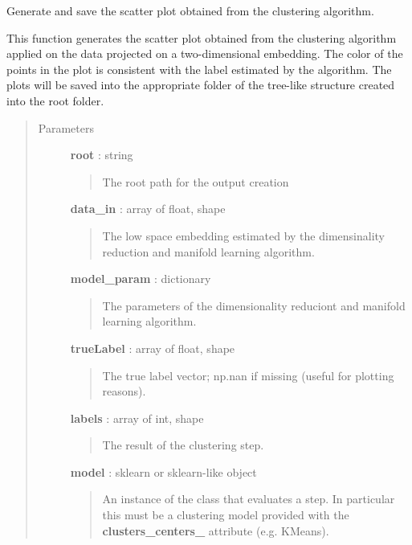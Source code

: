 \documentclass[letterpaper,10pt,english]{sphinxmanual}
\begin{document}

\begin{fulllineitems}
\label{index:adenine.core.analyze_results.make_scatterplot}
Generate and save the scatter plot obtained from the clustering algorithm.

This function generates the scatter plot obtained from the clustering algorithm applied on the data projected on a two-dimensional embedding. The color of the points in the plot is consistent with the label estimated by the algorithm. The plots will be saved into the appropriate folder of the tree-like structure created into the root folder.
\begin{quote}\begin{description}
\item[{Parameters}] \leavevmode
\textbf{root} : string
\begin{quote}

The root path for the output creation
\end{quote}

\textbf{data\_in} : array of float, shape
\begin{quote}

The low space embedding estimated by the dimensinality reduction and manifold learning algorithm.
\end{quote}

\textbf{model\_param} : dictionary
\begin{quote}

The parameters of the dimensionality reduciont and manifold learning algorithm.
\end{quote}

\textbf{trueLabel} : array of float, shape
\begin{quote}

The true label vector; np.nan if missing (useful for plotting reasons).
\end{quote}

\textbf{labels} : array of int, shape
\begin{quote}

The result of the clustering step.
\end{quote}

\textbf{model} : sklearn or sklearn-like object
\begin{quote}

An instance of the class that evaluates a step. In particular this must be a clustering model provided with the {\color{red}\bfseries{}clusters\_centers\_} attribute (e.g. KMeans).
\end{quote}

\end{description}\end{quote}

\end{fulllineitems}
\end{document}
